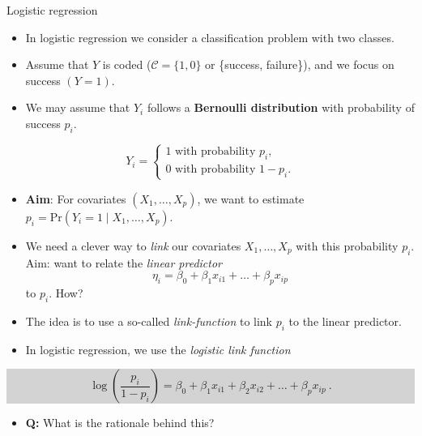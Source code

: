 \documentclass[10pt,ignorenonframetext,]{beamer}
\providecommand{\tightlist}{%
  \setlength{\itemsep}{0pt}\setlength{\parskip}{0pt}}
\begin{document}
\begin{frame}{Logistic regression}

\begin{itemize}
\item
  In logistic regression we consider a classification problem with two
  classes.
\item
  Assume that \(Y\) is coded (\(\mathcal{C} = \{1, 0\}\) or \{success,
  failure\}), and we focus on success \((Y=1)\).
\item
  We may assume that \(Y_i\) follows a \textbf{Bernoulli distribution}
  with probability of success \(p_i\).
\end{itemize}

\[Y_i = \begin{cases} 1 \text{ with probability } p_i, \\ 0 \text{ with probability } 1-p_i. \end{cases}\]

\begin{itemize}
\tightlist
\item
  \textbf{Aim}: For covariates \((X_1,\ldots,X_p)\), we want to estimate
  \(p_i = \text{Pr}(Y_i=1 \mid X_1,\ldots,X_p)\).
\end{itemize}

\end{frame}

\begin{frame}

\begin{itemize}
\item
  We need a clever way to \emph{link} our covariates
  \(X_1, \ldots, X_p\) with this probability \(p_i\). Aim: want to
  relate the \emph{linear predictor}
  \[\eta_i = \beta_0 + \beta_1 x_{i1} + \ldots + \beta_p x_{ip}\] to
  \(p_i\). How?
\item
  The idea is to use a so-called \emph{link-function} to link \(p_i\) to
  the linear predictor.
\item
  In logistic regression, we use the \emph{logistic link function}
\end{itemize}

\begin{center}
\colorbox{lightgray}{\begin{minipage}{10cm}
\begin{equation}
\log\left( \frac{p_i}{1-p_i} \right) = \beta_0 + \beta_1 x_{i1} + \beta_2 x_{i2} + \ldots + \beta_p x_{ip} \ .
\end{equation}
\end{minipage}}
\end{center}

\begin{itemize}
\tightlist
\item
  \textbf{Q:} What is the rationale behind this?
\end{itemize}

\end{frame}
\end{document}
